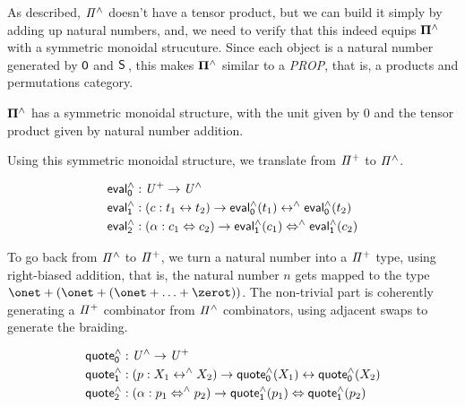 As described, $\mathit{{\Pi}^{\wedge}}$ doesn't have a tensor product, but we can build it simply by adding up natural numbers, and,
we need to verify that this indeed equips $\mathbf{\Pi^{\wedge}}$ with a symmetric monoidal strucuture. Since each object is a
natural number generated by $\operatorname{\mathsf{0}}$ and $\suc$, this makes $\mathbf{\Pi^{\wedge}}$ similar to a \emph{PROP}, that is, a products and
permutations category.

\begin{proposition}
  $\mathbf{\Pi^{\wedge}}$ has a symmetric monoidal structure, with the unit given by 0 and the tensor product given by natural
  number addition.
\end{proposition}

Using this symmetric monoidal structure, we translate from $\mathit{{\Pi}^{+}}$ to $\mathit{{\Pi}^{\wedge}}$.

\begin{definition}
  \begin{align*}
    \evalh_{0} & : \UPlus \to \UHat                                                          \\
    \evalh_{1} & : (c : t_{1} \iso t_{2}) \to \evalh_{0}(t_{1}) \isoh \evalh_{0}(t_{2})      \\
    \evalh_{2} & : (\alpha : c_{1} \Iso c_{2}) \to \evalh_{1}(c_{1}) \Isoh \evalh_{1}(c_{2}) \\
  \end{align*}
\end{definition}

To go back from $\mathit{{\Pi}^{\wedge}}$ to $\mathit{{\Pi}^{+}}$, we turn a natural number into a $\mathit{{\Pi}^{+}}$ type, using right-biased
addition, that is, the natural number $n$ gets mapped to the type $\onet + (\onet + (\onet + \ldots + \zerot))$. The
non-trivial part is coherently generating a $\mathit{{\Pi}^{+}}$ combinator from $\mathit{{\Pi}^{\wedge}}$ combinators, using adjacent swaps
to generate the braiding.

\begin{definition}
  \begin{align*}
    \quoteh_{0} & : \UHat \to \UPlus                                                            \\
    \quoteh_{1} & : (p : X_{1} \isoh X_{2}) \to \quoteh_{0}(X_{1}) \iso \quoteh_{0}(X_{2})      \\
    \quoteh_{2} & : (\alpha : p_{1} \Isoh p_{2}) \to \quoteh_{1}(p_{1}) \Iso \quoteh_{1}(p_{2}) \\
  \end{align*}
\end{definition}


